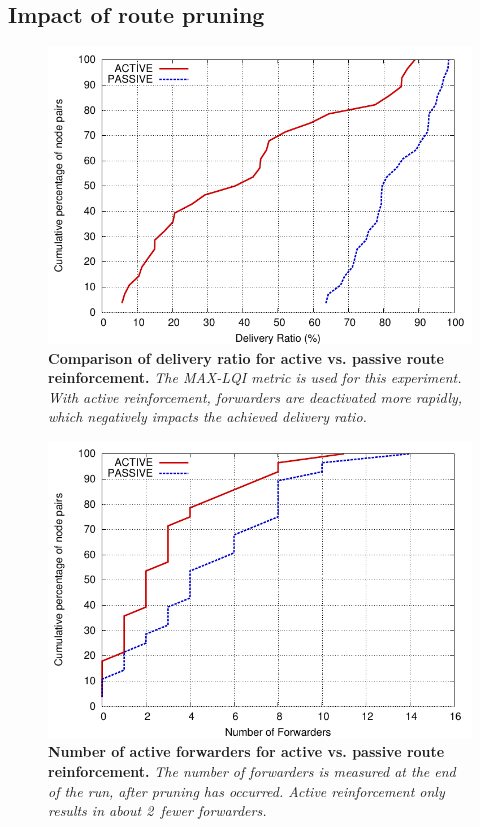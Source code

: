 \subsection{Impact of route pruning}
\label{sec-tinyadmr-pruning}

\begin{figure}[t]
\begin{center}
\includegraphics[width=0.6\hsize]{resources/tinyadmr-techrept05/figures/lessons/activevspassive/active_passive.pdf}
\end{center}
\caption{{\small {\bf Comparison of delivery ratio for active vs.
passive route reinforcement.} {\em The MAX-LQI metric is used for this
experiment. With active reinforcement, forwarders are deactivated
more rapidly, which negatively impacts the achieved delivery
ratio.}}}
\label{fig-pruning-cdf}
\end{figure}


\begin{figure}[t]
\begin{center}
\includegraphics[width=0.6\hsize]{resources/tinyadmr-techrept05/figures/lessons/activevspassive/active_passive_fwd.pdf}
\end{center}
\caption{{\small {\bf Number of active forwarders for active
vs. passive route reinforcement.} 
{\em The number of forwarders is measured at the end of the run,
after pruning has occurred. Active reinforcement only
results in about 2~fewer forwarders.}}}
\label{fig-pruning-forwarders}
\end{figure}



